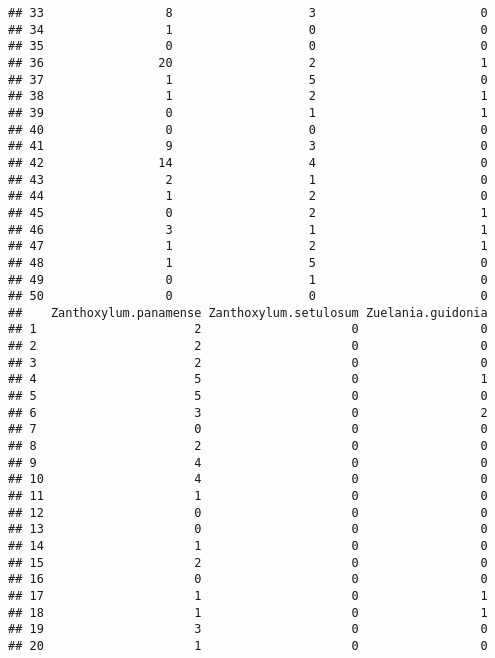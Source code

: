 \documentclass[
]{article}
\begin{document}
\begin{verbatim}
## 33                 8                   3                       0
## 34                 1                   0                       0
## 35                 0                   0                       0
## 36                20                   2                       1
## 37                 1                   5                       0
## 38                 1                   2                       1
## 39                 0                   1                       1
## 40                 0                   0                       0
## 41                 9                   3                       0
## 42                14                   4                       0
## 43                 2                   1                       0
## 44                 1                   2                       0
## 45                 0                   2                       1
## 46                 3                   1                       1
## 47                 1                   2                       1
## 48                 1                   5                       0
## 49                 0                   1                       0
## 50                 0                   0                       0
##    Zanthoxylum.panamense Zanthoxylum.setulosum Zuelania.guidonia
## 1                      2                     0                 0
## 2                      2                     0                 0
## 3                      2                     0                 0
## 4                      5                     0                 1
## 5                      5                     0                 0
## 6                      3                     0                 2
## 7                      0                     0                 0
## 8                      2                     0                 0
## 9                      4                     0                 0
## 10                     4                     0                 0
## 11                     1                     0                 0
## 12                     0                     0                 0
## 13                     0                     0                 0
## 14                     1                     0                 0
## 15                     2                     0                 0
## 16                     0                     0                 0
## 17                     1                     0                 1
## 18                     1                     0                 1
## 19                     3                     0                 0
## 20                     1                     0                 0

\end{verbatim}
\end{document}
